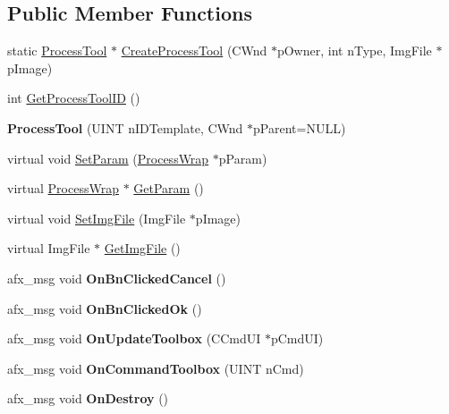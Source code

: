 \subsection*{Public Member Functions}
\begin{DoxyCompactItemize}
\item 
static \mbox{\hyperlink{class_process_tool}{Process\+Tool}} $\ast$ \mbox{\hyperlink{class_process_tool_a58b14d09ecf71dc46c978dc1afb56967}{Create\+Process\+Tool}} (C\+Wnd $\ast$p\+Owner, int n\+Type, Img\+File $\ast$p\+Image)
\item 
int \mbox{\hyperlink{class_process_tool_ab0e7d3a46484506a517325b938d537a0}{Get\+Process\+Tool\+ID}} ()
\item 
\mbox{\label{class_process_tool_a52953e59d84e5e8178dbe7ed38fcec6c}} 
{\bfseries Process\+Tool} (U\+I\+NT n\+I\+D\+Template, C\+Wnd $\ast$p\+Parent=N\+U\+LL)
\item 
virtual void \mbox{\hyperlink{class_process_tool_a50caa175198cece00b39a146715bf3eb}{Set\+Param}} (\mbox{\hyperlink{class_process_wrap}{Process\+Wrap}} $\ast$p\+Param)
\item 
virtual \mbox{\hyperlink{class_process_wrap}{Process\+Wrap}} $\ast$ \mbox{\hyperlink{class_process_tool_a355ebcf991f86f59f4241ea4345547fc}{Get\+Param}} ()
\item 
virtual void \mbox{\hyperlink{class_process_tool_a178bc06abf5a20220bd2306a14708a93}{Set\+Img\+File}} (Img\+File $\ast$p\+Image)
\item 
virtual Img\+File $\ast$ \mbox{\hyperlink{class_process_tool_abe1cbbab6613f24a752113a3ec4faaa8}{Get\+Img\+File}} ()
\item 
\mbox{\label{class_process_tool_a644f45cdf995090c61975f6fa345333f}} 
afx\+\_\+msg void {\bfseries On\+Bn\+Clicked\+Cancel} ()
\item 
\mbox{\label{class_process_tool_af707c18c69b52e97ea32b879c4fdc440}} 
afx\+\_\+msg void {\bfseries On\+Bn\+Clicked\+Ok} ()
\item 
\mbox{\label{class_process_tool_a639a520f4af641c5253c6655c6b499c6}} 
afx\+\_\+msg void {\bfseries On\+Update\+Toolbox} (C\+Cmd\+UI $\ast$p\+Cmd\+UI)
\item 
\mbox{\label{class_process_tool_a1f856d66a4dd11a9ddd215a971866306}} 
afx\+\_\+msg void {\bfseries On\+Command\+Toolbox} (U\+I\+NT n\+Cmd)
\item 
\mbox{\label{class_process_tool_a4aba1cb35feb212ea5771ad59e7e8427}} 
afx\+\_\+msg void {\bfseries On\+Destroy} ()
\end{DoxyCompactItemize}
